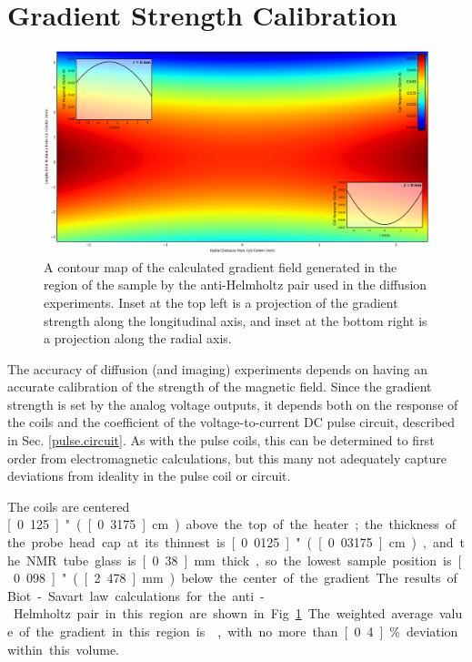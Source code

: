 \documentclass[PaulGanssle-Thesis.tex]{subfiles}
\begin{document}
\section{Gradient Strength Calibration}
\label{nmr.gradcal}
\begin{figure}[ht!]
\includegraphics[width=\tw]{figures/coils/GradientMap.png}
\caption{A contour map of the calculated gradient field generated in the region of the sample by the anti-Helmholtz pair used in the diffusion experiments. Inset at the top left is a projection of the gradient strength along the longitudinal axis, and inset at the bottom right is a projection along the radial axis.}
\label{fig:GradientMap}
\end{figure}
The accuracy of diffusion (and imaging) experiments depends on having an accurate calibration of the strength of the magnetic field. Since the gradient strength is set by the analog voltage outputs, it depends both on the response of the coils and the coefficient of the voltage-to-current DC pulse circuit, described in Sec. \ref{pulse.circuit}. As with the pulse coils, this can be determined to first order from electromagnetic calculations, but this many not adequately capture deviations from ideality in the pulse coil or circuit. 

The coils are centered \unit[0.125]{"} (\unit[0.3175]{cm}) above the top of the heater; the thickness of the probe head cap at its thinnest is \unit[0.0125]{"} (\unit[0.03175]{cm}), and the NMR tube glass is \unit[0.38]{mm} thick, so the lowest sample position is \unit[0.098]{"} (\unit[2.478]{mm}) below the center of the gradient. The results of Biot-Savart law calculations for the anti-Helmholtz pair in this region are shown in Fig. \ref{fig:GradientMap}. The weighted average value of the gradient in this region is , with no more than \unit[0.4]{\%} deviation within this volume.
\end{document}
